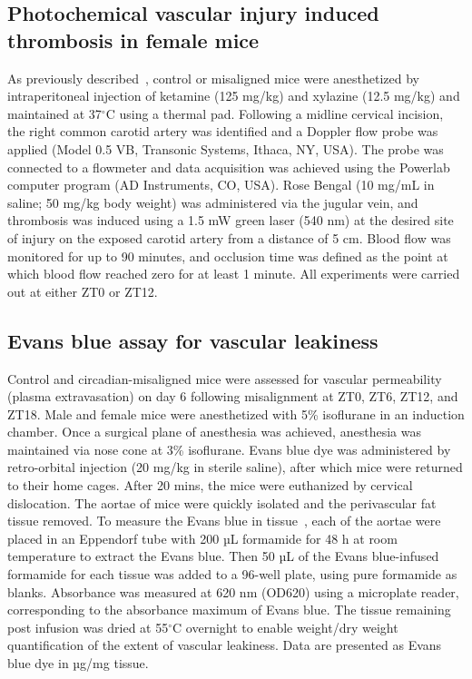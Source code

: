\documentclass[12pt]{article}
\begin{document}
\subsection*{Photochemical vascular injury induced thrombosis in female mice}

As previously described~\cite{ref142}, control or misaligned mice were anesthetized by intraperitoneal injection of ketamine (125 mg/kg) and xylazine (12.5 mg/kg) and maintained at 37$^{\circ}$C using a thermal pad. 
Following a midline cervical incision, the right common carotid artery was identified and a Doppler flow probe was applied (Model 0.5 VB, Transonic Systems, Ithaca, NY, USA).
The probe was connected to a flowmeter and data acquisition was achieved using the Powerlab computer program (AD Instruments, CO, USA). Rose Bengal (10 mg/mL in saline; 50 mg/kg body weight) was administered via the jugular vein, and thrombosis was induced using a 1.5 mW green laser (540 nm) at the desired site of injury on the exposed carotid artery from a distance of 5 cm.
Blood flow was monitored for up to 90 minutes, and occlusion time was defined as the point at which blood flow reached zero for at least 1 minute. 
All experiments were carried out at either ZT0 or ZT12. 

\subsection*{Evans blue assay for vascular leakiness}

Control and circadian-misaligned mice were assessed for vascular permeability (plasma extravasation) on day 6 following misalignment at ZT0, ZT6, ZT12, and ZT18. 
Male and female mice were anesthetized with 5\% isoflurane in an induction chamber. 
Once a surgical plane of anesthesia was achieved, anesthesia was maintained via nose cone at 3\% isoflurane.
Evans blue dye was administered by retro-orbital injection (20 mg/kg in sterile saline), after which mice were returned to their home cages.
After 20 mins, the mice were euthanized by cervical dislocation.
The aortae of mice were quickly isolated and the perivascular fat tissue removed.
To measure the Evans blue in tissue~\cite{ref143}, each of the aortae were placed in an Eppendorf tube with 200 µL formamide for 48 h at room temperature to extract the Evans blue.
Then 50 µL of the Evans blue-infused formamide for each tissue was added to a 96-well plate, using pure formamide as blanks. Absorbance was measured at 620 nm (OD620) using a microplate reader, corresponding to the absorbance maximum of Evans blue.
The tissue remaining post infusion was dried at 55$^{\circ}$C overnight to enable weight/dry weight quantification of the extent of vascular leakiness. 
Data are presented as Evans blue dye in µg/mg tissue. 
\end{document}
